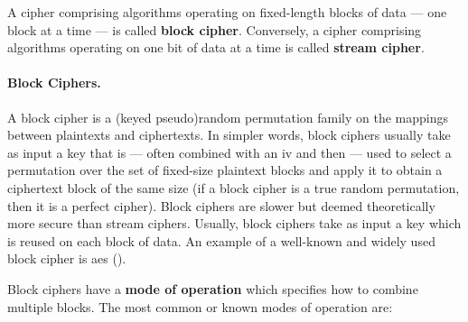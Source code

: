 A cipher comprising algorithms operating on fixed-length blocks of data --- one block at a time --- is called \textbf{block cipher}. Conversely, a cipher comprising algorithms operating on one bit of data at a time is called \textbf{stream cipher}.

\paragraph*{Block Ciphers.} A block cipher is a (keyed pseudo)random permutation family on the mappings between plaintexts and ciphertexts. In simpler words, block ciphers usually take as input a key that is --- often combined with an \gls{iv} and then --- used to select a permutation over the set of fixed-size plaintext blocks and apply it to obtain a ciphertext block of the same size (if a block cipher is a true random permutation, then it is a perfect cipher). Block ciphers are slower but deemed theoretically more secure than stream ciphers. Usually, block ciphers take as input a key which is reused on each block of data. An example of a well-known and widely used block cipher is \gls{aes} (). 


Block ciphers have a \textbf{mode of operation} which specifies how to combine multiple blocks. The most common or known modes of operation are:

